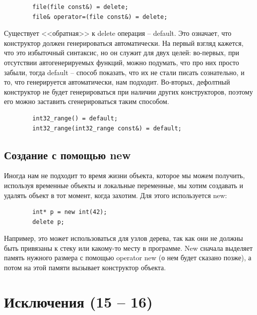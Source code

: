 \documentclass[12pt, a4paper]{article}
\begin{document}
	\begin{verbatim}
		file(file const&) = delete;
		file& operator=(file const&) = delete;
	\end{verbatim}
	\par Существует <<обратная>> к delete операция -- default. Это означает, что конструктор должен генерироваться автоматически. На первый взгляд кажется, что это избыточный синтаксис, но он служит для двух целей: во-первых, при отсутствии автогенерируемых функций, можно подумать, что про них просто забыли, тогда default -- способ показать, что их не стали писать сознательно, и то, что генерируется автоматически, нам подходит. Во-вторых, дефолтный конструктор не будет генерироваться при наличии других конструкторов, поэтому его можно заставить сгенерироваться таким способом.
	\begin{verbatim}
		int32_range() = default;
		int32_range(int32_range const&) = default;
	\end{verbatim}
	\subsection{Создание с помощью new}
	Иногда нам не подходит то время жизни объекта, которое мы можем получить, используя временные объекты и локальные переменные, мы хотим создавать и удалять объект в тот момент, когда захотим. Для этого используется new:
	\begin{verbatim}
		int* p = new int(42);
		delete p;
	\end{verbatim}
	Например, это может использоваться для узлов дерева, так как они не должны быть привязаны к стеку или какому-то месту в программе. New сначала выделяет память нужного размера с помощью operator new (о нем будет сказано позже), а потом на этой памяти вызывает конструктор объекта.
	\section{Исключения (15 -- 16)}
\end{document}

